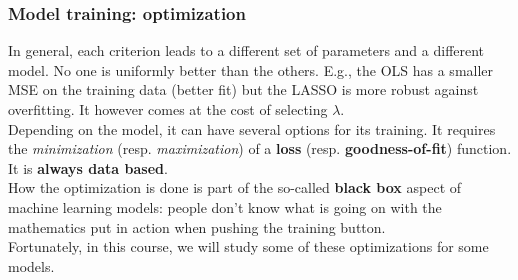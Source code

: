\begin{frame}
\frametitle{Model training: optimization}
In general, each criterion leads to a different set of parameters and a different model. No one is uniformly better than the others. E.g., the OLS has a smaller MSE on the training data (better fit) but the LASSO is more robust against overfitting. It however comes at the cost of selecting $\lambda$. \\ 
\vspace{0.3cm}
Depending on the model, it can have several options for its training. It requires the {\it minimization} (resp. {\it maximization}) of a {\bf loss} (resp. {\bf goodness-of-fit}) function. It is {\bf always data based}. \\
\vspace{0.3cm}
How the optimization is done is part of the so-called {\bf black box} aspect of machine learning models: people don't know what is going on with the mathematics put in action when pushing the training button.\\
\vspace{0.3cm}
Fortunately, in this course, we will study some of these optimizations for some models.
\end{frame}
